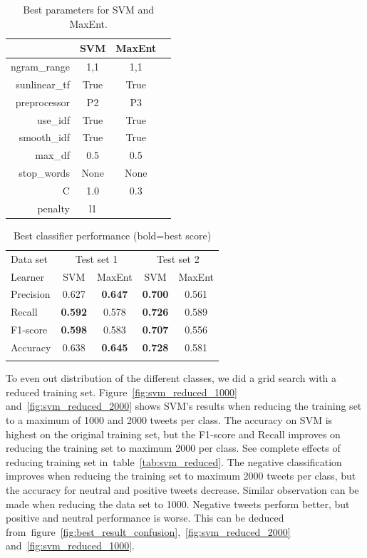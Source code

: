 \begin{table}[!htb]
\centering
\begin{tabular}{|r||c|c|c|} 
\cline{2-3}
\multicolumn{1}{c|}{ } & \textbf{SVM} & \textbf{MaxEnt} \\ \hline
ngram\_range & 1,1 & 1,1 \\ \hline
sunlinear\_tf  & True & True \\ \hline
preprocessor & P2 & P3 \\ \hline
use\_idf & True & True \\ \hline
smooth\_idf & True & True \\ \hline
max\_df & 0.5 & 0.5 \\ \hline
stop\_words & None & None \\ \hline
C & 1.0 & 0.3 \\ \hline
penalty & l1 & \\ \hline

\end{tabular}
\caption{Best parameters for SVM and MaxEnt.}
\label{tab:svm_maxent_best_params}
\end{table}


\begin{table}[!htb]
	\centering
	\begin{tabular}{l|cc|cc} 
	\noalign{\smallskip}\hline\noalign{\smallskip}
	Data set & \multicolumn{2}{c|}{Test set 1} & \multicolumn{2}{c}{Test set 2} \\
	Learner  & SVM    & MaxEnt & SVM    & MaxEnt \\
	\noalign{\smallskip}\hline\noalign{\smallskip}
	Precision  & 0.627  & {\bf 0.647}   & {\bf 0.700}  & 0.561 \\
	Recall       & {\bf 0.592}  & 0.578  & {\bf 0.726}  & 0.589 \\
	F1-score  & {\bf 0.598}  & 0.583  & {\bf 0.707}  & 0.556 \\
	Accuracy & 0.638  & {\bf 0.645}  & {\bf 0.728}  & 0.581 \\
	\noalign{\smallskip}\hline\noalign{\smallskip}
	\end{tabular}
	\caption{Best classifier performance {\small (bold=best score)}}
	\label{tab:performance}
\end{table}


To even out distribution of the different classes, we did a grid search with a reduced training set. Figure~\ref{fig:svm_reduced_1000} and~\ref{fig:svm_reduced_2000} shows SVM's results when reducing the training set to a maximum of 1000 and 2000 tweets per class. The accuracy on SVM is highest on the original training set, but the F1-score and Recall improves on reducing the training set to maximum 2000 per class. See complete effects of reducing training set in~table~\ref{tab:svm_reduced}. The negative classification improves when reducing the training set to maximum 2000 tweets per class, but the accuracy for neutral and positive tweets decrease. Similar observation can be made when reducing the data set to 1000. Negative tweets perform better, but positive and neutral performance is worse. This can be deduced from~figure~\ref{fig:best_result_confusion},~\ref{fig:svm_reduced_2000} and~\ref{fig:svm_reduced_1000}.


